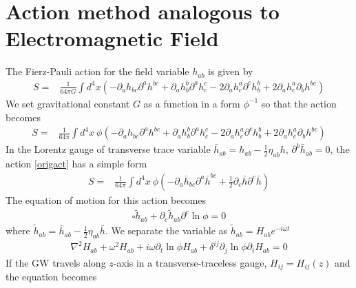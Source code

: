 \documentclass[
 jor,
 amsmath,amssymb,preprint,
]{revtex4-2}
\begin{document}
\section{Action method analogous to Electromagnetic Field}
The Fierz-Pauli action for the field variable $h_{ab}$ is given by~\cite{roy2020probing}
\begin{equation}
\begin{aligned}
S = & \frac{1}{64 \pi G} \int d^4 x\left(-\partial_a h_{b c} \partial^a h^{b c}+\partial_a h_b^b \partial^a h_c^c-2 \partial_a h_c^a \partial^c h_b^b+2 \partial_a h_c^a \partial_b h^{b c}\right)
\end{aligned}
\end{equation}
We set gravitational constant $G$ as a function in a form $\phi^{-1}$ so that the action becomes
\begin{equation}
\begin{aligned}
S = & \frac{1}{64 \pi} \int d^4 x~\phi\left(-\partial_a h_{b c} \partial^a h^{b c}+\partial_a h_b^b \partial^a h_c^c-2 \partial_a h_c^a \partial^c h_b^b+2 \partial_a h_c^a \partial_b h^{b c}\right) \label{origact}
\end{aligned}
\end{equation}
In the Lorentz gauge of transverse trace variable $\bar{h}_{ab} = h_{ab} - \frac{1}{2}\eta_{ab}h$, $\partial^b \bar{h}_{ab} = 0$, the action \eqref{origact} has a simple form
\begin{equation}
\begin{aligned}
S = & \frac{1}{64 \pi} \int d^4 x~\phi \left( -\partial_a\bar{h}_{bc}\partial^a\bar{h}^{bc} + \frac{1}{2}\partial_c\bar{h}\partial^c\bar{h} \right)
\end{aligned}
\end{equation}
The equation of motion for this action becomes
\begin{align}
\square \tilde{h}_{ab} + \partial_c\tilde{h}_{ab}\partial^c\ln\phi = 0 \label{fereom}
\end{align}
where $\tilde{h}_{ab} = \bar{h}_{ab} - \frac{1}{2} \eta_{ab}\bar{h}$. We separate the variable as $\tilde{h}_{ab} = H_{ab}e^{-i\omega t}$
\begin{equation}
\begin{aligned}
\nabla^2 H_{ab} + \omega^2 H_{ab} + i\omega \partial_t\ln \phi H_{ab} + \delta^{ij} \partial_j\ln \phi \partial_iH_{ab} = 0
\end{aligned}
\end{equation}
If the GW travels along $z$-axis in a transverse-traceless gauge, $H_{ij} = H_{ij}(z)$ and the equation becomes
\end{document}
